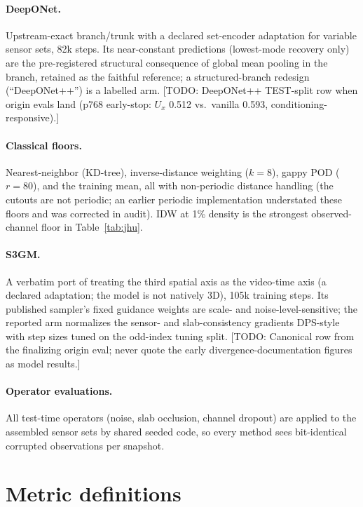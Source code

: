 \documentclass{article} %
\newcommand{\todo}[1]{{\color{red}[TODO: #1]}}
\begin{document}
\paragraph{DeepONet.} Upstream-exact branch/trunk with a declared set-encoder adaptation for variable sensor sets, 82k steps. Its near-constant predictions (lowest-mode recovery only) are the pre-registered structural consequence of global mean pooling in the branch, retained as the faithful reference; a structured-branch redesign (``DeepONet++'') is a labelled arm. \todo{DeepONet++ TEST-split row when origin evals land (p768 early-stop: $U_x$ 0.512 vs.\ vanilla 0.593, conditioning-responsive).}

\paragraph{Classical floors.} Nearest-neighbor (KD-tree), inverse-distance weighting ($k{=}8$), gappy POD ($r{=}80$), and the training mean, all with non-periodic distance handling (the cutouts are not periodic; an earlier periodic implementation understated these floors and was corrected in audit). IDW at 1\% density is the strongest observed-channel floor in Table~\ref{tab:jhu}.

\paragraph{S3GM.} A verbatim port of \citet{li2024s3gm} treating the third spatial axis as the video-time axis (a declared adaptation; the model is not natively 3D), 105k training steps. Its published sampler's fixed guidance weights are scale- and noise-level-sensitive; the reported arm normalizes the sensor- and slab-consistency gradients DPS-style with step sizes tuned on the odd-index tuning split. \todo{Canonical row from the finalizing origin eval; never quote the early divergence-documentation figures as model results.}

\paragraph{Operator evaluations.} All test-time operators (noise, slab occlusion, channel dropout) are applied to the assembled sensor sets by shared seeded code, so every method sees bit-identical corrupted observations per snapshot.

\section{Metric definitions}
\label{app:metrics}
\end{document}
